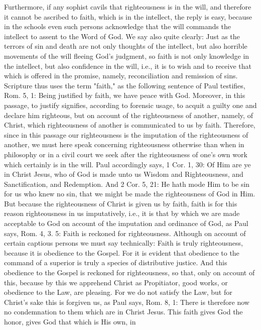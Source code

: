 Furthermore, if any sophist cavils that righteousness is in the will,
and therefore it cannot be ascribed to faith, which is in the
intellect, the reply is easy, because in the schools even such
persons acknowledge that the will commands the intellect to assent to
the Word of God.  We say also quite clearly: Just as the terrors of
sin and death are not only thoughts of the intellect, but also
horrible movements of the will fleeing God's judgment, so faith is
not only knowledge in the intellect, but also confidence in the will,
i.e., it is to wish and to receive that which is offered in the
promise, namely, reconciliation and remission of sins.  Scripture
thus uses the term "faith," as the following sentence of Paul
testifies, Rom. 5, 1: Being justified by faith, we have peace with
God.  Moreover, in this passage, to justify signifies, according to
forensic usage, to acquit a guilty one and declare him righteous, but
on account of the righteousness of another, namely, of Christ, which
righteousness of another is communicated to us by faith.  Therefore,
since in this passage our righteousness is the imputation of the
righteousness of another, we must here speak concerning righteousness
otherwise than when in philosophy or in a civil court we seek after
the righteousness of one's own work which certainly is in the will.
Paul accordingly says, 1 Cor. 1, 30: Of Him are ye in Christ Jesus,
who of God is made unto us Wisdom and Righteousness, and
Sanctification, and Redemption.  And 2 Cor. 5, 21: He hath mode Him
to be sin for us who knew no sin, that we might be made the
righteousness of God in Him.  But because the righteousness of Christ
is given us by faith, faith is for this reason righteousness in us
imputatively, i.e., it is that by which we are made acceptable to God
on account of the imputation and ordinance of God, as Paul says, Rom.
4, 3. 5: Faith is reckoned for righteousness.  Although on account of
certain captious persons we must say technically: Faith is truly
righteousness, because it is obedience to the Gospel.  For it is
evident that obedience to the command of a superior is truly a
species of distributive justice.  And this obedience to the Gospel is
reckoned for righteousness, so that, only on account of this, because
by this we apprehend Christ as Propitiator, good works, or obedience
to the Law, are pleasing.  For we do not satisfy the Law, but for
Christ's sake this is forgiven us, as Paul says, Rom. 8, 1: There is
therefore now no condemnation to them which are in Christ Jesus.
This faith gives God the honor, gives God that which is His own, in

